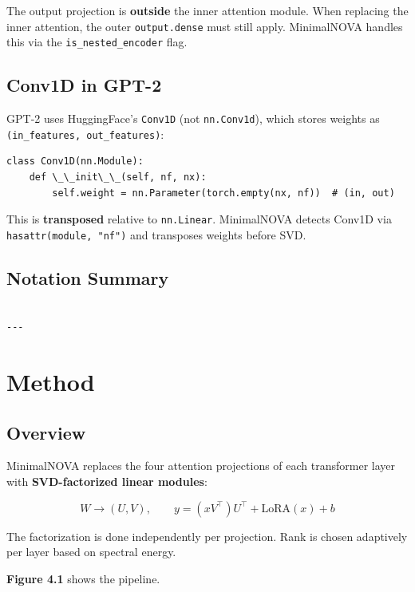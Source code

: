 The output projection is \textbf{outside} the inner attention module. When 
replacing the inner attention, the outer \texttt{output.dense} must still apply. 
MinimalNOVA handles this via the \texttt{is\_nested\_encoder} flag.

\subsection{Conv1D in GPT-2}

GPT-2 uses HuggingFace's \texttt{Conv1D} (not \texttt{nn.Conv1d}), which stores weights 
as \texttt{(in\_features, out\_features)}:

\begin{lstlisting}
class Conv1D(nn.Module):
    def \_\_init\_\_(self, nf, nx):
        self.weight = nn.Parameter(torch.empty(nx, nf))  # (in, out)
\end{lstlisting}

This is \textbf{transposed} relative to \texttt{nn.Linear}. MinimalNOVA detects Conv1D 
via \texttt{hasattr(module, "nf")} and transposes weights before SVD.

\subsection{Notation Summary}

\begin{lstlisting}

---
\end{lstlisting}


\section{Method}

\subsection{Overview}

MinimalNOVA replaces the four attention projections of each transformer layer 
with \textbf{SVD-factorized linear modules}:

\[
W \to (U, V), \qquad
y = (x V^\top) U^\top + \text{LoRA}(x) + b
\tag{4.1}
\]

The factorization is done independently per projection. Rank is chosen 
adaptively per layer based on spectral energy.

\textbf{Figure 4.1} shows the pipeline.

